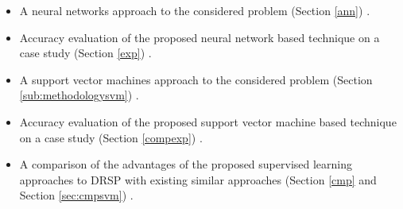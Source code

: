 \begin{itemize}
\item A neural networks approach to the considered problem (Section \ref{ann}) \cite{Czibula11Intelligent}.

\item Accuracy evaluation of the proposed neural network based technique on a case study (Section \ref{exp}) \cite{Czibula11Intelligent}.

\item A support vector machines approach to the considered problem (Section \ref{sub:methodologysvm}) \cite{Czibula12SVM}.

\item Accuracy evaluation of the proposed support vector machine based technique on a case study (Section \ref{compexp})  \cite{Czibula12SVM}.

\item A comparison of the advantages of the proposed supervised learning approaches to DRSP with existing similar approaches (Section \ref{cmp} and Section \ref{sec:cmpsvm}) \cite{Czibula11Intelligent, Czibula12SVM}.

\end{itemize}
